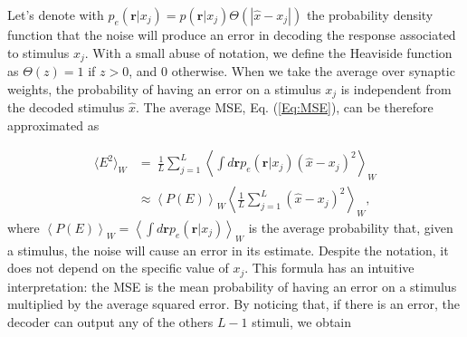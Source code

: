 \documentclass[a4paper]{article}%
\begin{document}
Let's denote with $p_{e}(\mathbf{r}|x_{j}) = p(\mathbf{r}|x_{j})\Theta\left(
|\hat{x}-x_{j}|\right)  $ the probability density function that the noise will
produce an error in decoding the response associated to stimulus $x_{j}$. With
a small abuse of notation, we define the Heaviside function as $\Theta(z) = 1$
if $z>0$, and 0 otherwise. When we take the average over synaptic weights, the
probability of having an error on a stimulus $x_{j}$ is independent from the
decoded stimulus $\hat{x}$. The average MSE, Eq. (\ref{Eq:MSE}), can be
therefore approximated as%

\begin{equation}%
\begin{split}
\langle E^{2} \rangle_{W}  &  = \ \frac{1}{L}\sum_{j=1}^{L}\left\langle \int
d\mathbf{r} p_{e}(\mathbf{r}|x_{j}) \left(  \hat{x}-x_{j} \right)
^{2}\right\rangle _{W}\\
&  \approx\left\langle P(E)\right\rangle _{W} \left\langle \frac{1}{L}%
\sum_{j=1}^{L} (\hat{x}-x_{j})^{2}\right\rangle _{W},\label{Eq:PE}%
\end{split}
\end{equation}
where $\left\langle P(E)\right\rangle _{W} = \left\langle \int d\mathbf{r}
p_{e}(\mathbf{r}|x_{j})\right\rangle _{W}$ is the average probability that,
given a stimulus, the noise will cause an error in its estimate. Despite the
notation, it does not depend on the specific value of $x_{j}$. This formula
has an intuitive interpretation: the MSE is the mean probability of having an
error on a stimulus multiplied by the average squared error. By noticing that,
if there is an error, the decoder can output any of the others $L-1$ stimuli,
we obtain%
\end{document}
